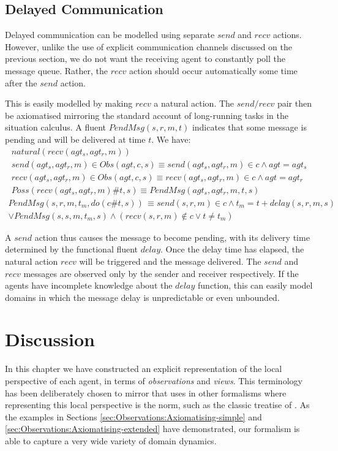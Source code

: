 \subsection{Delayed Communication}

Delayed communication can be modelled using separate $send$ and $recv$
actions. However, unlike the use of explicit communication channels
discussed on the previous section, we do not want the receiving agent
to constantly poll the message queue. Rather, the $recv$ action should
occur automatically some time after the $send$ action.

This is easily modelled by making $recv$ a natural action. The $send/recv$
pair then be axiomatised mirroring the standard account of long-running
tasks in the situation calculus. A fluent $PendMsg(s,r,m,t)$ indicates
that some message is pending and will be delivered at time $t$. We
have:\begin{gather*}
natural(recv(agt_{s},agt_{r},m))\\
send(agt_{s},agt_{r},m)\in Obs(agt,c,s)\equiv send(agt_{s},agt_{r},m)\in c\wedge agt=agt_{s}\\
recv(agt_{s},agt_{r},m)\in Obs(agt,c,s)\equiv recv(agt_{s},agt_{r},m)\in c\wedge agt=agt_{r}\\
Poss(recv(agt_{s},agt_{r},m)\#t,s)\equiv PendMsg(agt_{s},agt_{r},m,t,s)\end{gather*}
 \begin{multline*}
PendMsg(s,r,m,t_{m},do(c\#t,s))\,\equiv send(s,r,m)\in c\wedge t_{m}=t+delay(s,r,m,s)\\
\vee PendMsg(s,s,m,t_{m},s)\wedge\left(recv(s,r,m)\not\in c\vee t\neq t_{m}\right)\end{multline*}


A $send$ action thus causes the message to become pending, with its
delivery time determined by the functional fluent $delay$. Once the
delay time has elapsed, the natural action $recv$ will be triggered
and the message delivered. The $send$ and $recv$ messages are observed
only by the sender and receiver respectively. If the agents have incomplete
knowledge about the $delay$ function, this can easily model domains
in which the message delay is unpredictable or even unbounded.


\section{Discussion\label{sec:Observations:Discussion}}

In this chapter we have constructed an explicit representation of
the local perspective of each agent, in terms of \emph{observations}
and \emph{views}. This terminology has been deliberately chosen to
mirror that uses in other formalisms where representing this local
perspective is the norm, such as the classic treatise of \citet{halpern90knowledge_distrib}.
As the examples in Sections \ref{sec:Observations:Axiomatising-simple}
and \ref{sec:Observations:Axiomatising-extended} have demonstrated,
our formalism is able to capture a very wide variety of domain dynamics.

